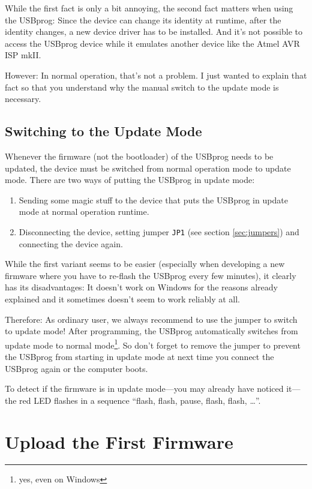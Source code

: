 \documentclass[bibtotoc,UKenglish,halfparskip,oneside,DIV12]{scrreprt}
\begin{document}
While the first fact is only a bit annoying, the second fact matters when using the USBprog: Since
the device can change its identity at runtime, after the identity changes, a new device driver has
to be installed. And it's not possible to access the USBprog device while it emulates another device
like the Atmel AVR ISP mkII.

However: In normal operation, that's not a problem. I just wanted to explain that fact so that you
understand why the manual switch to the update mode is necessary.



\subsection{Switching to the Update Mode}
\label{sec:switch_updatemode}

Whenever the firmware (not the bootloader) of the USBprog needs to be updated, the device must be
switched from normal operation mode to update mode. There are two ways of putting the USBprog in
update mode:

\begin{enumerate}
  \item Sending some magic stuff to the device that puts the USBprog in update mode at normal
    operation runtime.
  \item Disconnecting the device, setting jumper \texttt{JP1} (see section \vref{sec:jumpers})
    and connecting the device again.
\end{enumerate}

While the first variant seems to be easier (especially when developing a new firmware where you have
to re-flash the USBprog every few minutes), it clearly has its disadvantages: It doesn't work on
Windows for the reasons already explained and it sometimes doesn't seem to work reliably at all.

Therefore: As ordinary user, we always recommend to use the jumper to switch to update mode! After
programming, the USBprog automatically switches from update mode to normal mode\footnote{yes, even
on Windows}. So don't forget to remove the jumper to prevent the USBprog from starting in update
mode at next time you connect the USBprog again or the computer boots.

To detect if the firmware is in update mode---you may already have noticed it---the red LED flashes
in a sequence ``flash, flash, pause, flash, flash, \ldots''.


\section{Upload the First Firmware}
\label{sec:firstfirmware}
\end{document}
